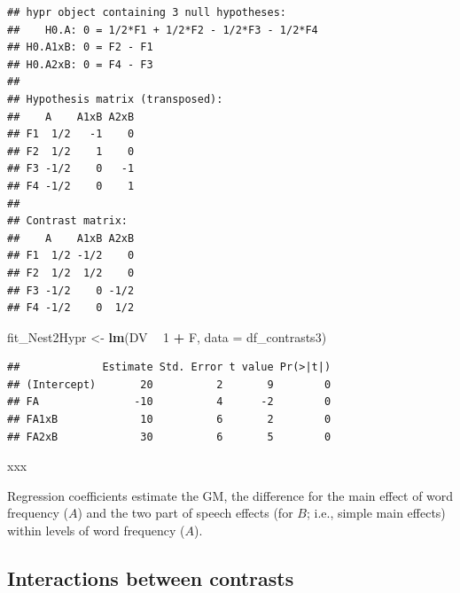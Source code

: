 \documentclass[12pt,]{krantz}
\newenvironment{Shaded}{\begin{snugshade}}{\end{snugshade}}
\newcommand{\DataTypeTok}[1]{\textcolor[rgb]{0.13,0.29,0.53}{#1}}
\newcommand{\DecValTok}[1]{\textcolor[rgb]{0.00,0.00,0.81}{#1}}
\newcommand{\KeywordTok}[1]{\textcolor[rgb]{0.13,0.29,0.53}{\textbf{#1}}}
\newcommand{\NormalTok}[1]{#1}
\newcommand{\OperatorTok}[1]{\textcolor[rgb]{0.81,0.36,0.00}{\textbf{#1}}}
\newcommand{\StringTok}[1]{\textcolor[rgb]{0.31,0.60,0.02}{#1}}
\begin{document}
\begin{verbatim}
## hypr object containing 3 null hypotheses:
##    H0.A: 0 = 1/2*F1 + 1/2*F2 - 1/2*F3 - 1/2*F4
## H0.A1xB: 0 = F2 - F1
## H0.A2xB: 0 = F4 - F3
## 
## Hypothesis matrix (transposed):
##    A    A1xB A2xB
## F1  1/2   -1    0
## F2  1/2    1    0
## F3 -1/2    0   -1
## F4 -1/2    0    1
## 
## Contrast matrix:
##    A    A1xB A2xB
## F1  1/2 -1/2    0
## F2  1/2  1/2    0
## F3 -1/2    0 -1/2
## F4 -1/2    0  1/2
\end{verbatim}

\begin{Shaded}
\end{Shaded}

\begin{Shaded}
\begin{Highlighting}[]
\NormalTok{fit_Nest2Hypr <-}\StringTok{ }\KeywordTok{lm}\NormalTok{(DV }\OperatorTok{~}\StringTok{ }\DecValTok{1} \OperatorTok{+}\StringTok{ }\NormalTok{F,}
                 \DataTypeTok{data =}\NormalTok{ df_contrasts3) }
\end{Highlighting}
\end{Shaded}

\begin{Shaded}
\end{Shaded}

\begin{verbatim}
##             Estimate Std. Error t value Pr(>|t|)
## (Intercept)       20          2       9        0
## FA               -10          4      -2        0
## FA1xB             10          6       2        0
## FA2xB             30          6       5        0
\end{verbatim}

xxx

Regression coefficients estimate the GM, the difference for the main effect of word frequency (\(A\)) and the two part of speech effects (for \(B\); i.e., simple main effects) within levels of word frequency (\(A\)).

\hypertarget{interactions-between-contrasts}{%
\subsection{Interactions between contrasts}\label{interactions-between-contrasts}}
\end{document}

